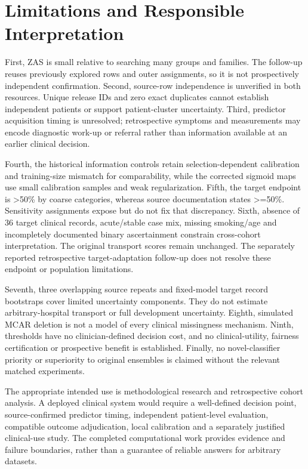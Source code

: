 \documentclass[conference]{IEEEtran}
\begin{document}
\section{Limitations and Responsible Interpretation}
First, ZAS is small relative to searching many groups and families. The follow-up reuses previously explored rows and outer assignments, so it is not prospectively independent confirmation. Second, source-row independence is unverified in both resources. Unique release IDs and zero exact duplicates cannot establish independent patients or support patient-cluster uncertainty. Third, predictor acquisition timing is unresolved; retrospective symptoms and measurements may encode diagnostic work-up or referral rather than information available at an earlier clinical decision.

Fourth, the historical information controls retain selection-dependent calibration and training-size mismatch for comparability, while the corrected sigmoid maps use small calibration samples and weak regularization. Fifth, the target endpoint is >50\% by coarse categories, whereas source documentation states >=50\%. Sensitivity assignments expose but do not fix that discrepancy. Sixth, absence of 36 target clinical records, acute/stable case mix, missing smoking/age and incompletely documented binary ascertainment constrain cross-cohort interpretation. The original transport scores remain unchanged. The separately reported retrospective target-adaptation follow-up does not resolve these endpoint or population limitations.

Seventh, three overlapping source repeats and fixed-model target record bootstraps cover limited uncertainty components. They do not estimate arbitrary-hospital transport or full development uncertainty. Eighth, simulated MCAR deletion is not a model of every clinical missingness mechanism. Ninth, thresholds have no clinician-defined decision cost, and no clinical-utility, fairness certification or prospective benefit is established. Finally, no novel-classifier priority or superiority to original ensembles is claimed without the relevant matched experiments.

The appropriate intended use is methodological research and retrospective cohort analysis. A deployed clinical system would require a well-defined decision point, source-confirmed predictor timing, independent patient-level evaluation, compatible outcome adjudication, local calibration and a separately justified clinical-use study. The completed computational work provides evidence and failure boundaries, rather than a guarantee of reliable answers for arbitrary datasets.
\end{document}
